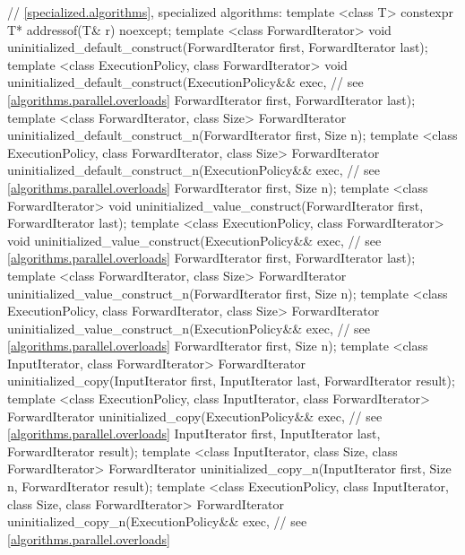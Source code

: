 \begin{codeblock}
{  // \ref{specialized.algorithms}, specialized algorithms:
  template <class T> constexpr T* addressof(T& r) noexcept;
  template <class ForwardIterator>
    void uninitialized_default_construct(ForwardIterator first, ForwardIterator last);
  template <class ExecutionPolicy, class ForwardIterator>
    void uninitialized_default_construct(ExecutionPolicy&& exec, // see \ref{algorithms.parallel.overloads}
                                         ForwardIterator first, ForwardIterator last);
  template <class ForwardIterator, class Size>
    ForwardIterator uninitialized_default_construct_n(ForwardIterator first, Size n);
  template <class ExecutionPolicy, class ForwardIterator, class Size>
    ForwardIterator uninitialized_default_construct_n(ExecutionPolicy&& exec, // see \ref{algorithms.parallel.overloads}
                                                      ForwardIterator first, Size n);
  template <class ForwardIterator>
    void uninitialized_value_construct(ForwardIterator first, ForwardIterator last);
  template <class ExecutionPolicy, class ForwardIterator>
    void uninitialized_value_construct(ExecutionPolicy&& exec, // see \ref{algorithms.parallel.overloads}
                                       ForwardIterator first, ForwardIterator last);
  template <class ForwardIterator, class Size>
    ForwardIterator uninitialized_value_construct_n(ForwardIterator first, Size n);
  template <class ExecutionPolicy, class ForwardIterator, class Size>
    ForwardIterator uninitialized_value_construct_n(ExecutionPolicy&& exec, // see \ref{algorithms.parallel.overloads}
                                                    ForwardIterator first, Size n);
  template <class InputIterator, class ForwardIterator>
    ForwardIterator uninitialized_copy(InputIterator first, InputIterator last,
                                       ForwardIterator result);
  template <class ExecutionPolicy, class InputIterator, class ForwardIterator>
    ForwardIterator uninitialized_copy(ExecutionPolicy&& exec, // see \ref{algorithms.parallel.overloads}
                                       InputIterator first, InputIterator last,
                                       ForwardIterator result);
  template <class InputIterator, class Size, class ForwardIterator>
    ForwardIterator uninitialized_copy_n(InputIterator first, Size n,
                                         ForwardIterator result);
  template <class ExecutionPolicy, class InputIterator, class Size, class ForwardIterator>
    ForwardIterator uninitialized_copy_n(ExecutionPolicy&& exec, // see \ref{algorithms.parallel.overloads}
}
\end{codeblock}
